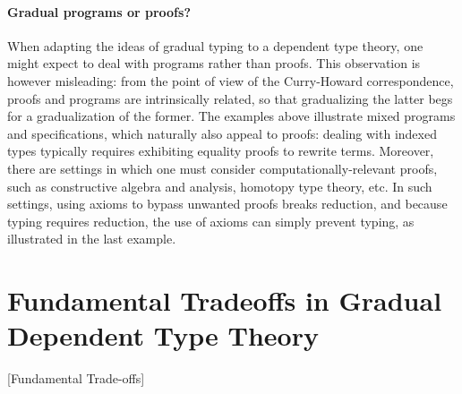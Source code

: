 \paragraph{Gradual programs or proofs?}

When adapting the ideas of gradual typing to a dependent type theory, one might
expect to deal with programs rather than proofs.
This observation is however misleading: from the point of view of the Curry-Howard correspondence, proofs and programs are intrinsically related, so that gradualizing the latter begs for a gradualization of the former. The examples above illustrate mixed programs and specifications, which naturally also appeal to proofs: dealing with indexed types typically requires exhibiting equality proofs to rewrite terms.
Moreover, there are settings in which one must consider computationally-relevant proofs, such as constructive algebra and analysis, homotopy type theory, etc. In such settings, using axioms to bypass unwanted proofs breaks reduction, and because typing requires reduction, the use of axioms can simply prevent typing, as illustrated in the last example.

\section{Fundamental Tradeoffs in Gradual Dependent Type Theory}[Fundamental Trade-offs]
\label{sec:tradeoffs}